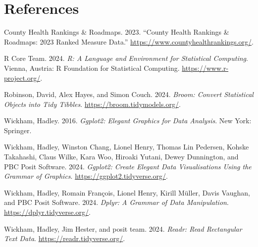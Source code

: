 \documentclass[
  letterpaper,
  DIV=11,
  numbers=noendperiod]{scrartcl}
\newlength{\cslhangindent}
\newenvironment{CSLReferences}[2] %
 {\begin{list}{}{%
  \setlength{\itemindent}{0pt}
  \setlength{\leftmargin}{0pt}
  \setlength{\parsep}{0pt}
  \ifodd #1
   \setlength{\leftmargin}{\cslhangindent}
   \setlength{\itemindent}{-1\cslhangindent}
  \fi
  \setlength{\itemsep}{#2\baselineskip}}}
 {\end{list}}
\begin{document}
\FloatBarrier

\section*{References}\label{references}

\label{refs}
\begin{CSLReferences}{1}{0}
County Health Rankings \& Roadmaps. 2023. {``County Health Rankings \&
Roadmaps: 2023 Ranked Measure Data.''}
\url{https://www.countyhealthrankings.org/}.

R Core Team. 2024. \emph{R: A Language and Environment for Statistical
Computing}. Vienna, Austria: R Foundation for Statistical Computing.
\url{https://www.r-project.org/}.

Robinson, David, Alex Hayes, and Simon Couch. 2024. \emph{Broom: Convert
Statistical Objects into Tidy Tibbles}.
\url{https://broom.tidymodels.org/}.

Wickham, Hadley. 2016. \emph{Ggplot2: Elegant Graphics for Data
Analysis}. New York: Springer.

Wickham, Hadley, Winston Chang, Lionel Henry, Thomas Lin Pedersen,
Kohske Takahashi, Claus Wilke, Kara Woo, Hiroaki Yutani, Dewey
Dunnington, and PBC Posit Software. 2024. \emph{Ggplot2: Create Elegant
Data Visualisations Using the Grammar of Graphics}.
\url{https://ggplot2.tidyverse.org/}.

Wickham, Hadley, Romain François, Lionel Henry, Kirill Müller, Davis
Vaughan, and PBC Posit Software. 2024. \emph{Dplyr: A Grammar of Data
Manipulation}. \url{https://dplyr.tidyverse.org/}.

Wickham, Hadley, Jim Hester, and posit team. 2024. \emph{Readr: Read
Rectangular Text Data}. \url{https://readr.tidyverse.org/}.

\end{CSLReferences}
\end{document}
